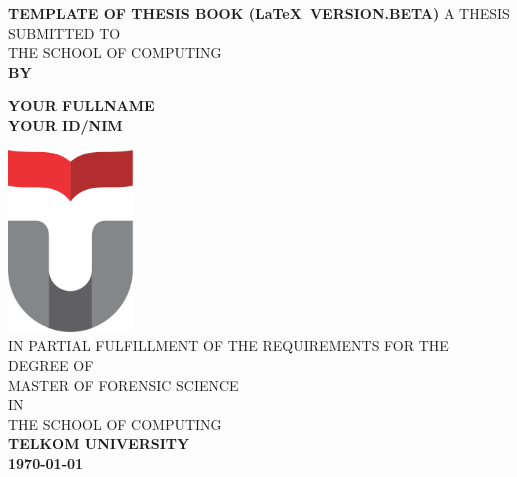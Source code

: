 \begin{titlepage}
\begin{center}
	\LARGE %
    {\sf\singlespacing 
		\textbf{TEMPLATE OF THESIS BOOK (\LaTeX~VERSION.BETA)}
	}
    \vfill
	\vfill
    \large
    { 
    	A THESIS SUBMITTED TO\\[0.2cm]
    	THE SCHOOL OF COMPUTING\\     
    }
	\vfill
    \sf\textbf{BY\\[0.5cm]}\par
    \large
    \textbf{YOUR FULLNAME\\[0.5cm]YOUR ID/NIM}\par
    \vfill
    \includegraphics[width=0.25\textwidth]{logo/TelkomUniversity}\\[1.5cm] 
    \vfill 
    \normalfont\large
    { 
		IN PARTIAL FULFILLMENT OF THE REQUIREMENTS FOR THE DEGREE OF\\
        MASTER OF FORENSIC SCIENCE\\
        IN\\
        THE SCHOOL OF COMPUTING\\
    }    
    \vfill
    \Large
	\sf\textbf{TELKOM UNIVERSITY}\\
	\sf\textbf{\myyear \today}
\end{center}
\end{titlepage}

